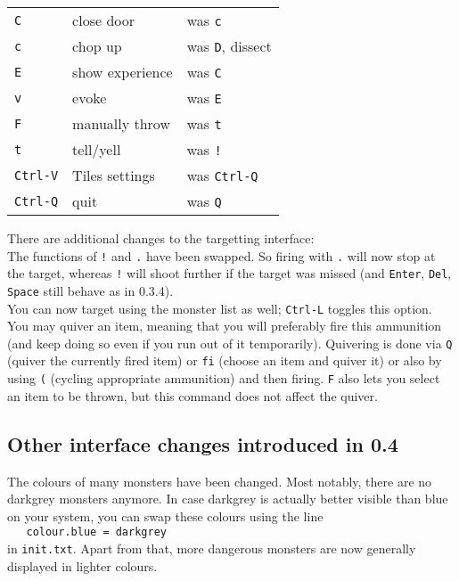 \documentclass[a4paper,10pt]{article}
\newcommand{\key}[1]{{\texttt{#1}}} %
\begin{document}
\begin{center}
\begin{tabular}{lll}
\key{C}      & close door       & was \key{c}      \\
\key{c}      & chop up          & was \key{D}, dissect \\
\key{E}      & show experience  & was \key{C}      \\
\key{v}      & evoke            & was \key{E}      \\
\key{F}      & manually throw   & was \key{t}      \\
\key{t}      & tell/yell        & was \key{!}      \\
\key{Ctrl-V} & Tiles settings   & was \key{Ctrl-Q} \\
\key{Ctrl-Q} & quit             & was \key{Q}
\end{tabular}
\end{center}

There are additional changes to the targetting interface: \\
The functions of \key{!} and \key{.} have been swapped. So firing with
\key{.} will now stop at the target, whereas \key{!} will shoot further
if the target was missed (and \key{Enter}, \key{Del}, \key{Space} still
behave as in 0.3.4). \\
You can now target using the monster list as well; \key{Ctrl-L} toggles
this option.\\
You may quiver an item, meaning that you will preferably fire this
ammunition (and keep doing so even if you run out of it temporarily). 
Quivering is done via \key{Q} (quiver the currently fired item) or 
\key{fi} (choose an item and quiver it) or also by using \key{(} (cycling 
appropriate ammunition) and then firing. \key{F} also lets you select an 
item to be thrown, but this command does not affect the quiver.

\newpage

\subsection*{Other interface changes introduced in 0.4}

The colours of many monsters have been changed. Most notably, there are
no darkgrey monsters anymore. In case darkgrey is actually better visible 
than blue on your system, you can swap these colours using the line \\
\verb#   colour.blue = darkgrey #\\
in \key{init.txt}. Apart from that, more dangerous monsters are now 
generally displayed in lighter colours.
\end{document}
